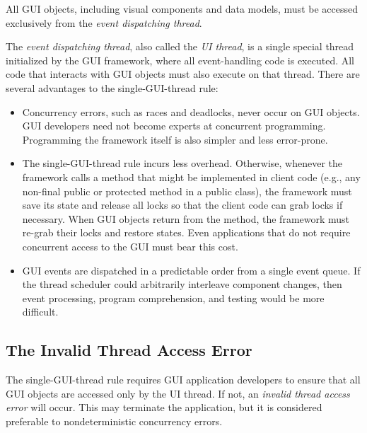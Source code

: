 \begin{myquotation}
All GUI objects, including visual components and data models, must be
 accessed exclusively from the \textit{event dispatching thread}.
\end{myquotation}

The \textit{event dispatching thread}, also called the \textit{UI thread}, is a single
special thread initialized by the GUI framework, where all event-handling code
is executed. All code that interacts with GUI objects must also
execute on that thread.  There are several advantages to the single-GUI-thread rule:

\begin{itemize}

\item Concurrency errors, such as races and deadlocks, never occur on GUI objects. 
GUI developers need not become experts at concurrent programming. Programming the
framework itself is also simpler and less error-prone.

\tinystep

\item The single-GUI-thread rule incurs less overhead.
Otherwise, whenever the framework calls a method that might
be implemented in client code (e.g., any non-final public or protected method in a public class),
the framework must save its state and release all locks so that the client code can grab locks
if necessary. When GUI objects return from the method, the framework must re-grab their locks and
restore states.  Even applications that do not require concurrent access to the GUI
must bear this cost.

\tinystep

\item GUI events are dispatched in a predictable order from a single event queue.
If the thread scheduler could arbitrarily interleave component changes, then event processing,
program comprehension, and testing would be more difficult.
\end{itemize}


\subsection{The Invalid Thread Access Error}

The single-GUI-thread rule requires GUI application developers to
 ensure that all GUI objects are accessed only by the UI thread.
If not, an \textit{invalid thread access error} will occur. This may
terminate the application, but it is considered preferable
to nondeterministic concurrency errors.

